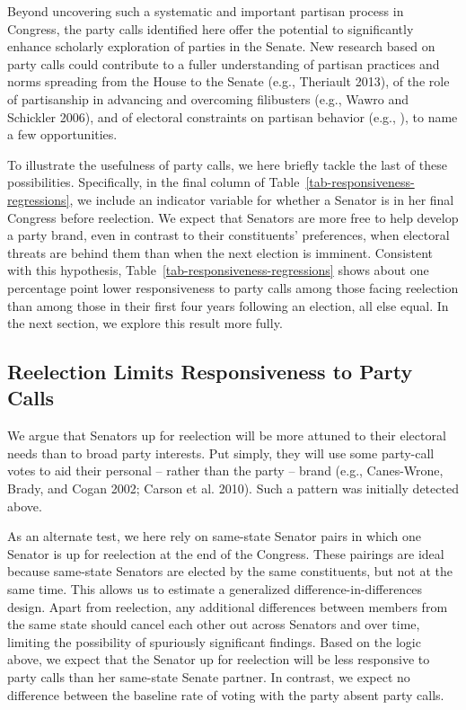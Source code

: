 \documentclass[12pt]{article}
\begin{document}
Beyond uncovering such a systematic and important partisan process in Congress, the party calls identified here offer the potential to significantly enhance scholarly exploration of parties in the Senate. New research based on party calls could contribute to a fuller understanding of partisan practices and norms spreading from the House to the Senate (e.g., Theriault 2013), of the role of partisanship in advancing and overcoming filibusters (e.g., Wawro and Schickler 2006), and of electoral constraints on partisan behavior (e.g., \cite{Levitt:1996}), to name a few opportunities.

To illustrate the usefulness of party calls, we here briefly tackle the last of these possibilities. Specifically, in the final column of Table~\ref{tab-responsiveness-regressions}, we include an indicator variable for whether a Senator is in her final Congress before reelection. We expect that Senators are more free to help develop a party brand, even in contrast to their constituents' preferences, when electoral threats are behind them than when the next election is imminent. Consistent with this hypothesis, Table~\ref{tab-responsiveness-regressions} shows about one percentage point lower responsiveness to party calls among those facing reelection than among those in their first four years following an election, all else equal. In the next section, we explore this result more fully.

\subsection*{Reelection Limits Responsiveness to Party Calls}

We argue that Senators up for reelection will be more attuned to their electoral needs than to broad party interests. Put simply, they will use some party-call votes to aid their personal -- rather than the party -- brand (e.g., Canes-Wrone, Brady, and Cogan 2002; Carson et al. 2010).  Such a pattern was initially detected above.

As an alternate test, we here rely on same-state Senator pairs in which one Senator is up for reelection at the end of the Congress. These pairings are ideal because same-state Senators are elected by the same constituents, but not at the same time. This allows us to estimate a generalized difference-in-differences design. Apart from reelection, any additional differences between members from the same state should cancel each other out across Senators and over time, limiting the possibility of spuriously significant findings. Based on the logic above, we expect that the Senator up for reelection will be less responsive to party calls than her same-state Senate partner. In contrast, we expect no difference between the baseline rate of voting with the party absent party calls.
\end{document}
